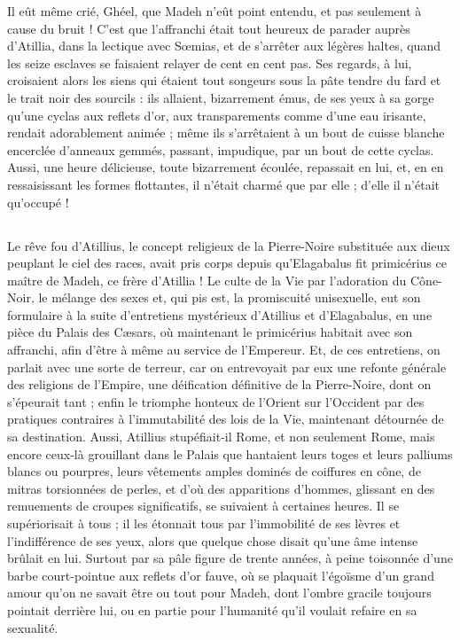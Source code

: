 \documentclass[a4paper, 11pt, oneside, polutonikogreek, french]{article}
\begin{document}
Il eût même crié, Ghéel, que Madeh n'eût point entendu, et pas seulement à cause du bruit ! C'est que l'affranchi était tout heureux de parader auprès d'Atillia, dans la lectique avec Sœmias, et de s'arrêter aux légères haltes, quand les seize esclaves se faisaient relayer de cent en cent pas. Ses regards, à lui, croisaient alors les siens qui étaient tout songeurs sous la pâte tendre du fard et le trait noir des sourcils : ils allaient, bizarrement émus, de ses yeux à sa gorge qu'une cyclas aux reflets d'or, aux transparements comme d'une eau irisante, rendait adorablement animée ; même ils s'arrêtaient à un bout de cuisse blanche encerclée d'anneaux gemmés, passant, impudique, par un bout de cette cyclas. Aussi, une heure délicieuse, toute bizarrement écoulée, repassait en lui, et, en en ressaisissant les formes flottantes, il n'était charmé que par elle ; d'elle il n'était qu'occupé !
\clearpage
\subsection{}
\paragraph{}
Le rêve fou d'Atillius, le concept religieux de la Pierre-Noire substituée aux dieux peuplant le ciel des races, avait pris corps depuis qu'Elagabalus fit primicérius ce maître de Madeh, ce frère d'Atillia ! Le culte de la Vie par l'adoration du Cône-Noir, le mélange des sexes et, qui pis est, la promiscuité unisexuelle, eut son formulaire à la suite d'entretiens mystérieux d'Atillius et d'Elagabalus, en une pièce du Palais des Cæsars, où maintenant le primicérius habitait avec son affranchi, afin d'être à même au service de l'Empereur. Et, de ces entretiens, on parlait avec une sorte de terreur, car on entrevoyait par eux une refonte générale des religions de l'Empire, une déification définitive de la Pierre-Noire, dont on s'épeurait tant ; enfin le triomphe honteux de l'Orient sur l'Occident par des pratiques contraires à l'immutabilité des lois de la Vie, maintenant détournée de sa destination. Aussi, Atillius stupéfiait-il Rome, et non seulement Rome, mais encore ceux-là grouillant dans le Palais que hantaient leurs toges et leurs palliums blancs ou pourpres, leurs vêtements amples dominés de coiffures en cône, de mitras torsionnées de perles, et d'où des apparitions d'hommes, glissant en des remuements de croupes significatifs, se suivaient à certaines heures. Il se supériorisait à tous ; il les étonnait tous par l'immobilité de ses lèvres et l'indifférence de ses yeux, alors que quelque chose disait qu'une âme intense brûlait en lui. Surtout par sa pâle figure de trente années, à peine toisonnée d'une barbe court-pointue aux reflets d'or fauve, où se plaquait l'égoïsme d'un grand amour qu'on ne savait être ou tout pour Madeh, dont l'ombre gracile toujours pointait derrière lui, ou en partie pour l'humanité qu'il voulait refaire en sa sexualité.
\end{document}
